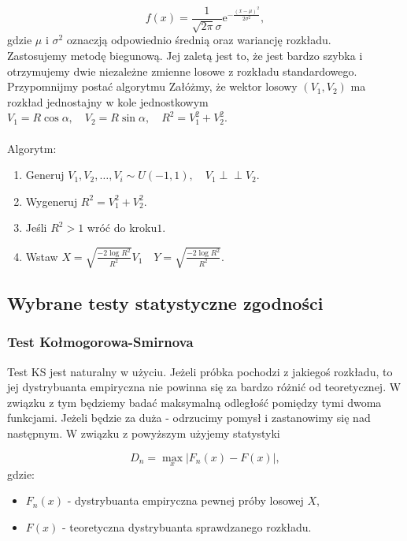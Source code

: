 \documentclass{article}
\theoremstyle{break}
\newcommand*{\e}{\mathrm{e}}
\newcommand{\indep}{\perp \!\!\! \perp}
\numberwithin{equation}{subsection}
\numberwithin{figure}{section}
\begin{document}
\begin{equation}
	f(x) = \frac{1}{\sqrt{2\pi}\sigma}\e^{-\frac{(x-\mu)^2}{2\sigma^2}}, \label{eq:normalny}
\end{equation}
gdzie $\mu$ i $\sigma^2$ oznaczją odpowiednio średnią oraz wariancję rozkładu.\\

Zastosujemy metodę biegunową. Jej zaletą jest to, że jest bardzo szybka i otrzymujemy dwie niezależne zmienne losowe z rozkładu standardowego.
Przypomnijmy postać algorytmu Załóżmy, że wektor losowy $(V_1,V_2)$ ma rozkład jednostajny w kole jednostkowym $V_1=R\cos\alpha,\quad V_2=R\sin\alpha,\quad R^2=V_1^2+V_2^2$.\\\\
Algorytm:
\begin{enumerate}
    \item Generuj $V_1 ,V_2, \dots, V_i \sim U(-1,1), \quad V_1\indep V_2 $.
    \item Wygeneruj $R^2 = V_1^2 + V_2^2$.
    \item Jeśli $R^2>1 $ wróć do kroku$1$.
    \item Wstaw $X=\sqrt{\frac{-2\log R^2}{R^2}}V_1 \quad Y=\sqrt{\frac{-2\log R^2}{R^2}}$.
\end{enumerate}

\newpage

\subsection{Wybrane testy statystyczne zgodności}

\subsubsection{Test Kołmogorowa-Smirnova}

Test KS jest naturalny w użyciu. Jeżeli próbka pochodzi z jakiegoś rozkładu, to jej dystrybuanta empiryczna nie powinna się za bardzo różnić od teoretycznej. W związku z tym będziemy badać maksymalną odległość pomiędzy tymi dwoma funkcjami. Jeżeli będzie za duża - odrzucimy pomysł i zastanowimy się nad następnym. W związku z powyższym użyjemy statystyki

\begin{equation}
D_n = \max_x|F_n(x)-F(x)|, \label{eq: 1.11}
\end{equation}
gdzie:

\begin{itemize}
\item $F_n(x)$ - dystrybuanta empiryczna pewnej próby losowej $X$,
\item $F(x)$ - teoretyczna dystrybuanta sprawdzanego rozkładu.
\end{itemize}
\end{document}
